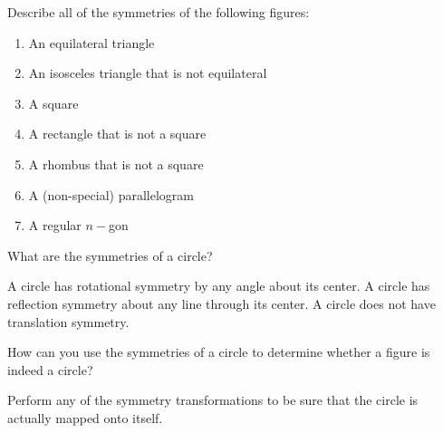\documentclass[nooutcomes]{ximera}
\begin{document}
\begin{question}
Describe all of the symmetries of the following figures: 
\begin{enumerate}
\item An equilateral triangle
\item An isosceles triangle that is not equilateral
\item A square
\item A rectangle that is not a square
\item A rhombus that is not a square
\item A (non-special) parallelogram
\item A regular $n-$gon
\end{enumerate}
\begin{freeResponse}
\begin{hint}
\end{hint}
\end{freeResponse}
\end{question}

\begin{question}
What are the symmetries of a circle? 
\begin{freeResponse}
\begin{hint}
A circle has rotational symmetry by any angle about its center.  A circle has reflection symmetry about any line through its center.  A circle does not have translation symmetry.  
\end{hint}
\end{freeResponse}
\end{question}

\begin{question}
How can you use the symmetries of a circle to determine whether a figure is indeed a circle?  
\begin{freeResponse}
\begin{hint}
Perform any of the symmetry transformations to be sure that the circle is actually mapped onto itself.  
\end{hint}
\end{freeResponse}
\end{question}
\end{document}
